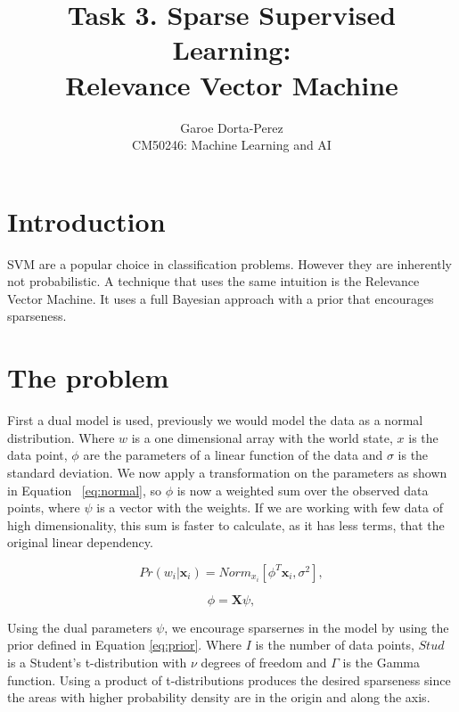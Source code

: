 \documentclass[12pt]{article}
\begin{document}
  
\title{Task 3. Sparse Supervised Learning:\\ Relevance Vector Machine}
\author{Garoe Dorta-Perez\\
CM50246: Machine Learning and AI}
 
\maketitle
 
\section{Introduction}
 
SVM  are a popular choice in classification problems.
However they are inherently not probabilistic.
A technique that uses the same intuition is the Relevance Vector Machine.
It uses a full Bayesian approach with a prior that encourages sparseness.

\section{The problem}

First a dual model is used, previously we would model the data as a normal distribution.
Where $w$ is a one dimensional array with the world state, $x$ is the data point, $\phi$ are the parameters of a linear function of the data and $\sigma$ is the standard deviation.
We now apply a transformation on the parameters as shown in Equation ~\ref{eq:normal}, so $\phi$ is now a weighted sum over the observed data points, where $\psi$ is a vector with the weights.
If we are working with few data of high dimensionality, this sum is faster to calculate, as it has less terms, that the original linear dependency.

\begin{equation}
\label{eq:normal}
Pr(w_i|\mathbf{x}_i) = Norm_{x_i}[\phi^T \mathbf{x}_i, \sigma^2],
\end{equation}

\begin{equation}
\label{eq:dual}
\phi = \mathbf{X} \psi,
\end{equation}

Using the dual parameters $\psi$, we encourage sparsernes in the model by using the prior defined in Equation \ref{eq:prior}.
Where $I$ is the number of data points, $Stud$ is a Student's t-distribution with $\nu$ degrees of freedom and $\Gamma$ is the Gamma function.
Using a product of t-distributions produces the desired sparseness since the areas with higher probability density are in the origin and along the axis.
\end{document}
